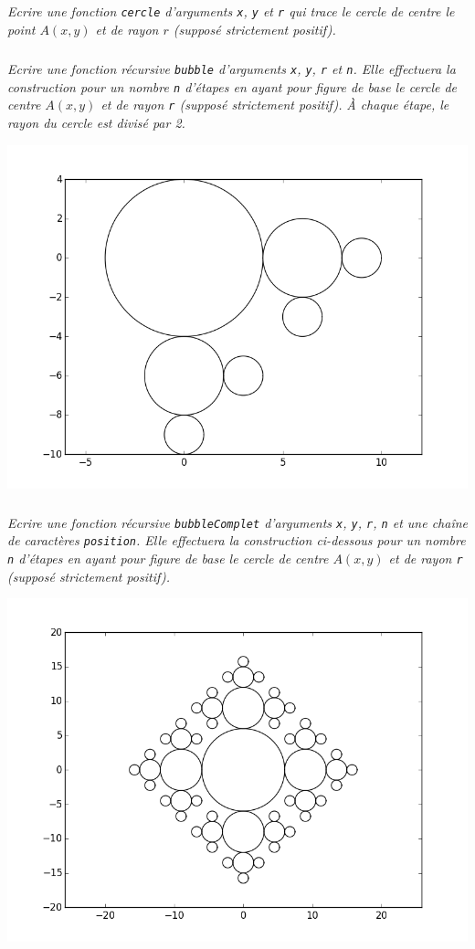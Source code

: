 \fi

\subparagraph{}
\textit{Ecrire une fonction \texttt{cercle} d'arguments \texttt{x}, \texttt{y} et \texttt{r} qui trace le cercle de 
centre le point $A(x, y)$ et de rayon $r$ (supposé strictement positif).}

\subparagraph{}
\textit{Ecrire une fonction récursive \texttt{bubble} d'arguments \texttt{x}, \texttt{y}, \texttt{r} et \texttt{n}. Elle 
effectuera la construction pour un nombre \texttt{n} d'étapes en ayant pour figure de base le cercle de centre $A(x, y)$ 
et de rayon \texttt{r} (supposé strictement positif).}
\textit{À chaque étape, le rayon du cercle est divisé par 2.}
\begin{center}
\includegraphics[width=.65\linewidth]{images/fig_03}
\end{center}

\subparagraph{}
\textit{Ecrire une fonction récursive \texttt{bubbleComplet} d'arguments \texttt{x}, \texttt{y}, \texttt{r}, \texttt{n} 
et une chaîne de caractères \texttt{position}. Elle effectuera la construction ci-dessous pour un nombre \texttt{n} 
d'étapes en ayant pour figure de base le cercle de centre $A(x, y)$ et de rayon \texttt{r} (supposé strictement 
positif).}
\begin{center}
\includegraphics[width=.65\linewidth]{images/bulles}
\end{center}

